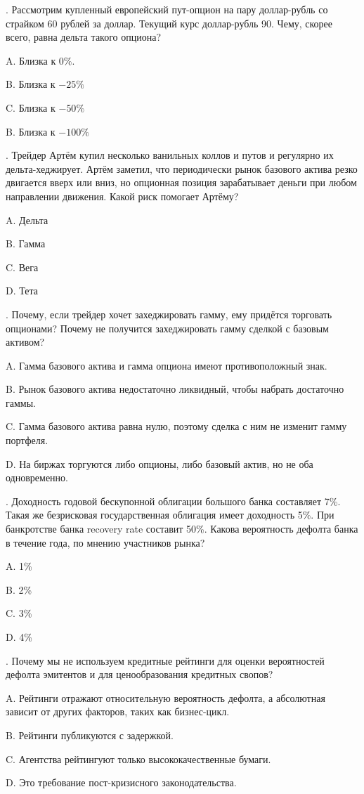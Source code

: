 \documentclass[a4paper,12pt]{extarticle}
\begin{document}
\thispagestyle{empty}

. Рассмотрим купленный европейский пут-опцион на пару доллар-рубль со страйком 60 рублей за доллар. Текущий курс доллар-рубль 90. Чему, скорее всего, равна дельта такого опциона?

A. Близка к $0\%$.

B. Близка к $-25\%$

C. Близка к $-50\%$

B. Близка к $-100\%$

\vspace{0.5cm}

. Трейдер Артём купил несколько ванильных коллов и путов и регулярно их дельта-хеджирует. Артём заметил, что периодически рынок базового актива резко двигается вверх или вниз, но опционная позиция зарабатывает деньги при любом направлении движения. Какой риск помогает Артёму?

A. Дельта

B. Гамма

C. Вега

D. Тета

\vspace{0.5cm}

. Почему, если трейдер хочет захеджировать гамму, ему придётся торговать опционами? Почему не получится захеджировать гамму сделкой с базовым активом?

A. Гамма базового актива и гамма опциона имеют противоположный знак.

B. Рынок базового актива недостаточно ликвидный, чтобы набрать достаточно гаммы.

C. Гамма базового актива равна нулю, поэтому сделка с ним не изменит гамму портфеля.

D. На биржах торгуются либо опционы, либо базовый актив, но не оба одновременно.

\vspace{0.5cm}

. Доходность годовой бескупонной облигации большого банка составляет 7\%. Такая же безрисковая государственная облигация имеет доходность 5\%. При банкротстве банка recovery rate составит 50\%. Какова вероятность дефолта банка в течение года, по мнению участников рынка?

A. 1\%

B. 2\%

C. 3\%

D. 4\%

\vspace{0.5cm}

. Почему мы не используем кредитные рейтинги для оценки вероятностей дефолта эмитентов и для ценообразования кредитных свопов?

A. Рейтинги отражают относительную вероятность дефолта, а абсолютная зависит от других факторов, таких как бизнес-цикл.

B. Рейтинги публикуются с задержкой.

C. Агентства рейтингуют только высококачественные бумаги.

D. Это требование пост-кризисного законодательства.
\end{document}
